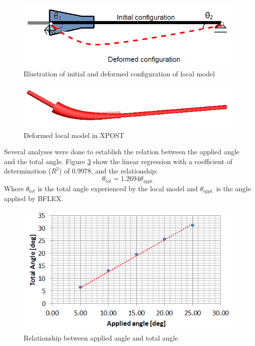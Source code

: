 \begin{figure}[H]
\centering
\includegraphics[scale=0.75]{figures/anglecorr1}
\caption[Initial and deformed configuration of local model]{Illustration of initial and deformed configuration of local model}
 \label{fig:anglecorr1}
\end{figure}

\begin{figure}[H]
\centering
\includegraphics[scale=0.75]{figures/anglecorrre}
\caption[Deformed local model in XPOST]{Deformed local model in XPOST}
 \label{fig:anglecorrre}
\end{figure}
 Several analyses were done to establish the relation between the applied angle and the total angle. Figure \ref{fig:anglerel} show the linear regression with a coefficient of determination ($R^2$) of 0.9978, and the relationship:
\begin{equation}
    \theta_{tot}=1.2694\theta_{appl.}
\label{eq:lincorr}
\end{equation}
Where $\theta_{tot}$ is the total angle experienced by the local model and $\theta_{appl.}$ is the angle applied by BFLEX.
\begin{figure}[H]
\centering
\includegraphics[scale=0.8]{figures/anglerel}
\caption[Relationship between applied angle and total angle]{Relationship between applied angle and total angle}
 \label{fig:anglerel}
\end{figure}


